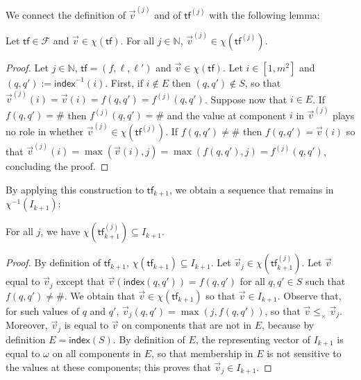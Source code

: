 \documentclass[10pt,a4paper]{article}
\let\mathbb\mathds
\renewcommand{\leq}{\leqslant}
\newcommand{\nats}{\mathbb{N}}
\newcommand{\nset}[2]{[#1,#2]}
\newcommand{\deff}{:=}
\newcommand*{\abuchistate}{\ell}
\newcommand*{\controlloc}{\abuchistate}
\newcommand*{\dummysymb}{\#}
\newcommand*{\transferflows}{\mathcal{F}}
\newcommand*{\atf}{\mathsf{tf}}
\newcommand*{\leprod}{\leq_{\times}}
\newcommand*{\mapencoding}{\chi}
\newcommand*{\indexof}{\mathsf{index}}
\begin{document}
\begin{appendixproof}
	We connect the definition of \(\vec{v}^{(j)}\) and of \(\atf^{(j)}\) with the following lemma:

	\begin{lemma}
		\label{vj-tfj}
		Let \(\atf \in \transferflows\) and \(\vec{v} \in \mapencoding(\atf)\).
		For all \(j \in \nats\), \(\vec{v}^{(j)} \in \mapencoding(\atf^{(j)})\).
	\end{lemma}
	\begin{proof}
		Let \(j \in \nats\), \(\atf = (f, \controlloc, \controlloc')\) and \(\vec{v} \in \mapencoding(\atf)\).
		Let \(i \in \nset{1}{m^2}\) and \((q,q') \deff \indexof^{-1}(i)\).
		First, if \(i \notin E\) then \((q,q') \notin S\), so that \(\vec{v}^{(j)}(i) = \vec{v}(i) = f(q,q') = f^{(j)}(q,q')\).
		Suppose now that \(i \in E\).
		If \(f(q,q') = \dummysymb\) then \(f^{(j)}(q,q') = \dummysymb\) and the value at component \(i\) in \(\vec{v}^{(j)}\) plays no role in whether \(\vec{v}^{(j)} \in \mapencoding(\atf^{(j)})\).
		If \(f(q,q') \ne \dummysymb\) then \(f(q,q') = \vec{v}(i)\) so that \(\vec{v}^{(j)}(i) = \max(\vec{v}(i),j) = \max(f(q,q'),j) = f^{(j)}(q,q')\), concluding the proof.
	\end{proof}

	By applying this construction to \(\atf_{k+1}\), we obtain a sequence that remains in \(\mapencoding^{-1}(I_{k+1})\):

	\begin{lemma}
		\label{atfj-remains-in-Ikplusone}
		For all \(j\), we have \(\mapencoding(\atf_{k+1}^{(j)}) \subseteq I_{k+1}\).
	\end{lemma}
	\begin{proof}
		By definition of \(\atf_{k+1}\), \(\mapencoding(\atf_{k+1}) \subseteq I_{k+1}\).
		Let \(\vec{v}_j \in \mapencoding(\atf_{k+1}^{(j)})\).
		Let \(\vec{v}\) equal to \(\vec{v}_j\) except that \(\vec{v}(\indexof(q,q')) = f(q,q')\) for all \(q,q' \in S\) such that \(f(q,q') \ne \dummysymb\).
		We obtain that \(\vec{v} \in \mapencoding(\atf_{k+1})\) so that \(\vec{v}\in I_{k+1}\).
		Observe that, for such values of \(q\) and \(q'\), \(\vec{v}_j(q,q') = \max(j, f(q,q'))\), so that \(\vec{v}\leprod \vec{v}_j\).
		Moreover, \(\vec{v}_j\) is equal to \(\vec{v}\) on components that are not in \(E\), because by definition \(E = \indexof(S)\).
		By definition of \(E\), the representing vector of \(I_{k+1}\) is equal to \(\omega\) on all components in \(E\), so that membership in \(E\) is not sensitive to the values at these components; this proves that \(\vec{v}_j \in I_{k+1}\).
	\end{proof}


\end{appendixproof}
\end{document}
